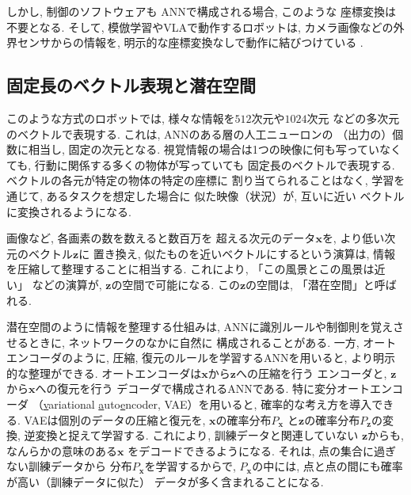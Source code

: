 \documentclass[twocolumn]{jarticle} %
\newcommand{\V}[1]{\boldsymbol{#1}}
\begin{document}
しかし, 制御のソフトウェアも
ANNで構成される場合, このような
座標変換は不要となる. 
そして, 模倣学習やVLAで動作するロボットは, 
カメラ画像などの外界センサからの情報を, 
明示的な座標変換なしで動作に結びつけている
\cite{black2024,brohan2023,zhao2023}. 


\subsection{固定長のベクトル表現と潜在空間}

このような方式のロボットでは, 
様々な情報を$512$次元や$1024$次元
などの多次元のベクトルで表現する. 
これは, ANNのある層の人工ニューロンの
（出力の）個数に相当し, 固定の次元となる. 
視覚情報の場合は1つの映像に何も写っていなくても, 
行動に関係する多くの物体が写っていても
固定長のベクトルで表現する. 
ベクトルの各元が特定の物体の特定の座標に
割り当てられることはなく, 
学習を通じて, あるタスクを想定した場合に
似た映像（状況）が, 互いに近い
ベクトルに変換されるようになる. 




画像など, 各画素の数を数えると数百万を
超える次元のデータ$\V{x}$を, より低い次元のベクトル$\V{z}$に
置き換え, 似たものを近いベクトルにするという演算は, 
情報を圧縮して整理することに相当する. 
これにより, 「この風景とこの風景は近い」
などの演算が, $\V{z}$の空間で可能になる. 
この$\V{z}$の空間は, 「潜在空間」と呼ばれる. 

潜在空間のように情報を整理する仕組みは, 
ANNに識別ルールや制御則を覚えさせるときに, 
ネットワークのなかに自然に
構成されることがある\cite{krizhevsky2012,mnih2015}. 
一方, オートエンコーダ\cite{hinton2006}のように, 
圧縮, 復元のルールを学習するANNを用いると, 
より明示的な整理ができる. 
オートエンコーダは$\V{x}$から$\V{z}$への圧縮を行う
エンコーダと, $\V{z}$から$\V{x}$への復元を行う
デコーダで構成されるANNである. 
特に変分オートエンコーダ
（\underline{v}ariational \underline{a}uto\underline{e}ncoder, 
VAE）\cite{kingma2014}を用いると, 
確率的な考え方を導入できる. 
VAEは個別のデータの圧縮と復元を, 
$\V{x}$の確率分布$P_{\V{x}}$
と$\V{z}$の確率分布$P_{\V{z}}$の変換, 
逆変換と捉えて学習する. 
これにより, 訓練データと関連していない
$\V{z}$からも, なんらかの意味のある$\V{x}$
をデコードできるようになる.
それは, 点の集合に過ぎない訓練データから
分布$P_{\V{x}}$を学習するからで, 
$P_{\V{x}}$の中には, 
点と点の間にも確率が高い（訓練データに似た）
データが多く含まれることになる. 
\end{document}
